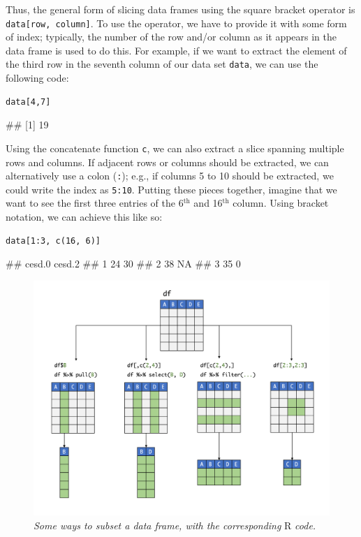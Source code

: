 Thus, the general form of slicing data frames using the square bracket operator is \texttt{data[row, column]}. To use the operator, we have to provide it with some form of index; typically, the number of the row and/or column as it appears in the data frame is used to do this. For example, if we want to extract the element of the third row in the seventh column of our data set \texttt{data}, we can use the following code:

\begin{lstlisting}
data[4,7]
\end{lstlisting}
\begin{example}
## [1] 19
\end{example}

Using the concatenate function \texttt{c}, we can also extract a slice spanning multiple rows and columns. If adjacent rows or columns should be extracted, we can alternatively use a colon (\texttt{:}); e.g., if columns 5 to 10 should be extracted, we could write the index as \texttt{5:10}. Putting these pieces together, imagine that we want to see the first three entries of the 6$^{\text{th}}$ and 16$^{\text{th}}$ column. Using bracket notation, we can achieve this like so:

\begin{lstlisting}
data[1:3, c(16, 6)]
\end{lstlisting}
\begin{example}
##   cesd.0 cesd.2
## 1     24     30
## 2     38     NA
## 3     35      0
\end{example}

\begin{figure}[t]
\includegraphics[width=12cm]{images/slicing.png}
\captionsetup{labelformat=empty} 
\centering
\caption{\emph{Some ways to subset a data frame, with the  corresponding} \textsf{R} \emph{code.}}
\end{figure}

